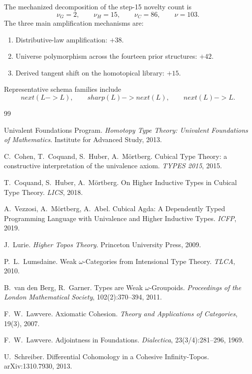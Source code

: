 \documentclass[11pt,a4paper]{article}
\def\to{->}%
\def\sharp{sharp}%
\def\bigcirc{next}%
\theoremstyle{plain}
\theoremstyle{definition}
\theoremstyle{remark}
\begin{document}
The mechanized decomposition of the step-15 novelty count is
\[
  \nu_G=2,
  \qquad
  \nu_H=15,
  \qquad
  \nu_C=86,
  \qquad
  \nu=103.
\]
The three main amplification mechanisms are:
\begin{enumerate}[nosep]
    \item Distributive-law amplification: $+38$.
    \item Universe polymorphism across the fourteen prior structures: $+42$.
    \item Derived tangent shift on the homotopical library: $+15$.
\end{enumerate}

Representative schema families include
\[
  \bigcirc(L\to L),
  \qquad
  \sharp(L)\to \bigcirc(L),
  \qquad
  \bigcirc(L)\to L.
\]

\begin{thebibliography}{99}

Univalent Foundations Program.
\textit{Homotopy Type Theory: Univalent Foundations of Mathematics}.
Institute for Advanced Study, 2013.

C.~Cohen, T.~Coquand, S.~Huber, A.~M\"ortberg.
Cubical Type Theory: a constructive interpretation of the univalence axiom.
\textit{TYPES 2015}, 2015.

T.~Coquand, S.~Huber, A.~M\"ortberg.
On Higher Inductive Types in Cubical Type Theory.
\textit{LICS}, 2018.

A.~Vezzosi, A.~M\"ortberg, A.~Abel.
Cubical Agda: A Dependently Typed Programming Language with Univalence and Higher Inductive Types.
\textit{ICFP}, 2019.

J.~Lurie.
\textit{Higher Topos Theory}.
Princeton University Press, 2009.

P.~L.~Lumsdaine.
Weak $\omega$-Categories from Intensional Type Theory.
\textit{TLCA}, 2010.

B.~van den Berg, R.~Garner.
Types are Weak $\omega$-Groupoids.
\textit{Proceedings of the London Mathematical Society}, 102(2):370--394, 2011.

F.~W.~Lawvere.
Axiomatic Cohesion.
\textit{Theory and Applications of Categories}, 19(3), 2007.

F.~W.~Lawvere.
Adjointness in Foundations.
\textit{Dialectica}, 23(3/4):281--296, 1969.

U.~Schreiber.
Differential Cohomology in a Cohesive Infinity-Topos.
arXiv:1310.7930, 2013.


\end{thebibliography}
\end{document}
